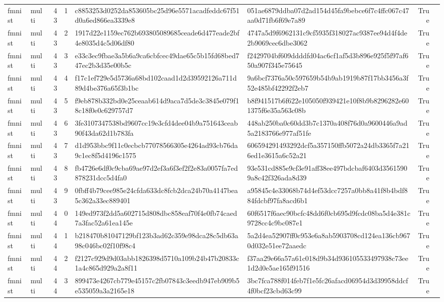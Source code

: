 \begin{tabular}{llrrllrl}
fmnist & multi & 43 & 1 & c8853253d0252da853605bc25d96e5571acadfeddc67f51d0a6ed866ea3339e8 & 051ae6879ddba07d2ad154d45fa9bebce6f7c4ffc067c47aa0d71fb6f69e7a89 & True &  \\
fmnist & multi & 43 & 2 & 1917d22e1159ec762b693805089685ceade6d477eade2bf4e8035d4c5d06df80 & 4747a5d9f6962131c9cf5935f318027ac9387ee94d4f4de2b9069cec6dbe3062 & True &  \\
fmnist & multi & 43 & 3 & e33c3ec9fbae3a5b6a9ca6cbfcec49dae65c5b15fd68bed747ec2b3d35e00b5c & f2429704bf609ddddfd04ac6cf1af5d3b896e925f5f97af650a907f345e75645 & True &  \\
fmnist & multi & 43 & 4 & f17c1ef729e5d5736a68bd102caad1d2d39592126a711d89d4be376a65f3b1bc & 9a6bcf7376a50c597659b54b9ab1919b87f17bb3456a3f52e485bf42292f2eb7 & True &  \\
fmnist & multi & 43 & 5 & f9eb878b332bd0e25ceaab614d9aca7d5de3c3845e079f18c18f0e0c629757d7 & b8f941517b6f622e105050f939421e10f8b9b8296282e601375f6e35a563c08b & True &  \\
fmnist & multi & 43 & 6 & 3fe3107347538bd9607cc19e3cfd4dee04b9a751643ceab90f43da62d1b783fa & 448ab250ba0c60dd3b7c1370a408f76d0a9600446a9ad5a2183766e977af51fe & True &  \\
fmnist & multi & 43 & 7 & d1d953bbc9f11c0ecbcb77078566305e4264ad93cb76da9c1ec8f5d4196c1575 & 606594291493292dcf5a357150ffb5072a24db3365f7a216ed1e3615a6c52a21 & True &  \\
fmnist & multi & 43 & 8 & fb4726e6df0c9cba69ae97d2ef3a6f3ef2f2e83a0057fa7ed878231dcc5d4fa0 & 93e531cd885e9cf3e91aff38ee497bdcbaf6403d35615909a8c42f326ada8d39 & True &  \\
fmnist & multi & 43 & 9 & 0fbff4b79cee985e24cfda633dc8fcb2dca24b70a4147bea5c362a33ec889401 & a95845c4e33068b74d4ef53dcc7257a0bb8a41f8b4bdf884fdcbf97fa8acd6b1 & True &  \\
fmnist & multi & 44 & 0 & 149ed973f2dd5a602715d808dbc858eaf70f4e0fb74caed7a3fac52a61ea145e & 60f6517f6aec90bcfc48dd6f0cb695d9fcdc08ba5d4e381c9728cc4c9bc087e1 & True &  \\
fmnist & multi & 44 & 1 & b218470b81047129bf123b3ad62c359e98dca28c5db63a98c046bc02f10f98c4 & 5a2d4ea52907ff0c953e6a8ab5903708cd124ea136cb9670d032e51ee72aaedc & True &  \\
fmnist & multi & 44 & 2 & f2127c929d9d03abb1826398d5710a109b24b47b20833c1a4c865d929a2a8f11 & f37aa29e66a57a61c018d9b34d936105533497938c73ee1d2d0e5ae165f91516 & True &  \\
fmnist & multi & 44 & 3 & 899473e4267cb779e45157c2fb07843c3eedb947eb909b5e535059a3a2165e18 & 3bc7fca788f014feb7f1e5fc26afacd06954d3d39958ddcf4f0bcf23cbd63c99 & True &  \\

\end{tabular}
